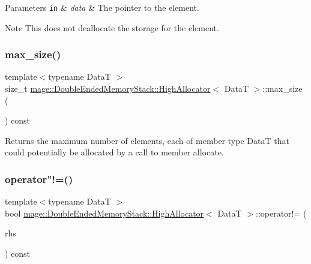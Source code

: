 \begin{DoxyParams}[1]{Parameters}
\mbox{\tt in}  & {\em data} & The pointer to the element. \\
\hline
\end{DoxyParams}
\begin{DoxyNote}{Note}
This does not deallocate the storage for the element. 
\end{DoxyNote}
\hypertarget{structmage_1_1_double_ended_memory_stack_1_1_high_allocator_a6adfd0ed341c637ce0d0edc9d3d02c27}{}\label{structmage_1_1_double_ended_memory_stack_1_1_high_allocator_a6adfd0ed341c637ce0d0edc9d3d02c27} 
\subsubsection{\texorpdfstring{max\+\_\+size()}{max\_size()}}
{\footnotesize\ttfamily template$<$typename DataT $>$ \\
size\+\_\+t \hyperlink{structmage_1_1_double_ended_memory_stack_1_1_high_allocator}{mage\+::\+Double\+Ended\+Memory\+Stack\+::\+High\+Allocator}$<$ DataT $>$\+::max\+\_\+size (\begin{DoxyParamCaption}{ }\end{DoxyParamCaption}) const\hspace{0.3cm}{\ttfamily [noexcept]}}

Returns the maximum number of elements, each of member type {\ttfamily DataT} that could potentially be allocated by a call to member allocate. \hypertarget{structmage_1_1_double_ended_memory_stack_1_1_high_allocator_a824b84ed67215c42e573508e065f9507}{}\label{structmage_1_1_double_ended_memory_stack_1_1_high_allocator_a824b84ed67215c42e573508e065f9507} 
\subsubsection{\texorpdfstring{operator"!=()}{operator!=()}}
{\footnotesize\ttfamily template$<$typename DataT $>$ \\
bool \hyperlink{structmage_1_1_double_ended_memory_stack_1_1_high_allocator}{mage\+::\+Double\+Ended\+Memory\+Stack\+::\+High\+Allocator}$<$ DataT $>$\+::operator!= (\begin{DoxyParamCaption}\item[{const \hyperlink{structmage_1_1_double_ended_memory_stack_1_1_high_allocator}{High\+Allocator}$<$ DataT $>$ \&}]{rhs }\end{DoxyParamCaption}) const\hspace{0.3cm}{\ttfamily [noexcept]}}

